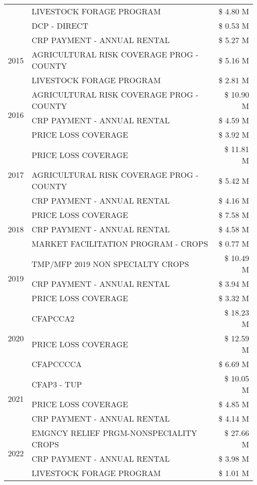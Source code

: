 \begin{tabular}{llr}
 & LIVESTOCK FORAGE PROGRAM & \$ 4.80 M \\
 & DCP - DIRECT & \$ 0.53 M \\
\cline{1-3}
\multirow[t]{3}{*}{2015} & CRP PAYMENT - ANNUAL RENTAL & \$ 5.27 M \\
 & AGRICULTURAL RISK COVERAGE PROG - COUNTY & \$ 5.16 M \\
 & LIVESTOCK FORAGE PROGRAM & \$ 2.81 M \\
\cline{1-3}
\multirow[t]{3}{*}{2016} & AGRICULTURAL RISK COVERAGE PROG - COUNTY & \$ 10.90 M \\
 & CRP PAYMENT - ANNUAL RENTAL & \$ 4.59 M \\
 & PRICE LOSS COVERAGE & \$ 3.92 M \\
\cline{1-3}
\multirow[t]{3}{*}{2017} & PRICE LOSS COVERAGE & \$ 11.81 M \\
 & AGRICULTURAL RISK COVERAGE PROG - COUNTY & \$ 5.42 M \\
 & CRP PAYMENT - ANNUAL RENTAL & \$ 4.16 M \\
\cline{1-3}
\multirow[t]{3}{*}{2018} & PRICE LOSS COVERAGE & \$ 7.58 M \\
 & CRP PAYMENT - ANNUAL RENTAL & \$ 4.58 M \\
 & MARKET FACILITATION PROGRAM - CROPS & \$ 0.77 M \\
\cline{1-3}
\multirow[t]{3}{*}{2019} & TMP/MFP 2019 NON SPECIALTY CROPS & \$ 10.49 M \\
 & CRP PAYMENT - ANNUAL RENTAL & \$ 3.94 M \\
 & PRICE LOSS COVERAGE & \$ 3.32 M \\
\cline{1-3}
\multirow[t]{3}{*}{2020} & CFAPCCA2 & \$ 18.23 M \\
 & PRICE LOSS COVERAGE & \$ 12.59 M \\
 & CFAPCCCCA & \$ 6.69 M \\
\cline{1-3}
\multirow[t]{3}{*}{2021} & CFAP3 - TUP & \$ 10.05 M \\
 & PRICE LOSS COVERAGE & \$ 4.85 M \\
 & CRP PAYMENT - ANNUAL RENTAL & \$ 4.14 M \\
\cline{1-3}
\multirow[t]{3}{*}{2022} & EMGNCY RELIEF PRGM-NONSPECIALITY CROPS & \$ 27.66 M \\
 & CRP PAYMENT - ANNUAL RENTAL & \$ 3.98 M \\
 & LIVESTOCK FORAGE PROGRAM & \$ 1.01 M \\
\cline{1-3}
\bottomrule
\end{tabular}
